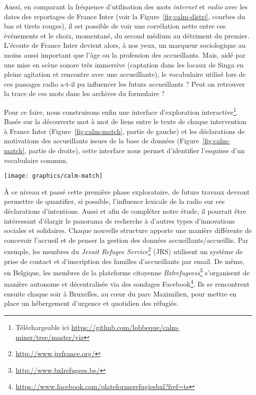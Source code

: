 \documentclass[symmetric,justified,marginals=raggedouter]{tufte-book}
\begin{document}
Aussi, en comparant la fréquence d'utilisation des mots \textit{internet} et \textit{radio} avec les dates des reportages de France Inter (voir la Figure~\ref{fig:calm-distri}, courbes du bas et tirets rouges), il est possible de voir une corrélation nette entre ces événements et le choix, momentané, du second médium au détriment du premier. L'écoute de France Inter devient alors, à nos yeux, un marqueur sociologique au moins aussi important que l'âge ou la profession des accueillants. Mais, aidé par une mise en scène sonore très immersive (captation dans les locaux de Singa en pleine agitation et rencontre avec une accueillante), le vocabulaire utilisé lors de ces passages radio a-t-il pu influencer les futurs accueillants ? Peut on retrouver la trace de ces mots dans les archives du formulaire ? 

Pour ce faire, nous construisons enfin une interface d'exploration interactive\footnote{\RaggedOuter Téléchargeable ici \url{https://github.com/lobbeque/calm-miner/tree/master/viz}}. Basée sur la découverte mot à mot de liens entre le texte de chaque intervention à France Inter (Figure~\ref{fig:calm-match}, partie de gauche) et les déclarations de motivations des accueillants issues de la base de données (Figure~\ref{fig:calm-match}, partie de droite), cette interface nous permet d'identifier l'esquisse d'un vocabulaire commun.

\begin{figure*}
  \texttt{[image: graphics/calm-match]}
  \caption{Utilisation d'un même vocabulaire (bleu) entre les reportages de France Inter (gauche) et les déclarations de motivation des accueillants (droite)}
  \label{fig:calm-match}
\end{figure*}

\noindent À ce niveau et passé cette première phase exploratoire, de futurs travaux devront permettre de quantifier, si possible, l'influence lexicale de la radio sur ces déclarations d'intentions. Aussi et afin de compléter notre étude, il pourrait être intéressant d'élargir le panorama de recherche à d'autres types d'innovations sociales et solidaires. Chaque nouvelle structure apporte une manière différente de concevoir l'accueil et de penser la gestion des données accueillants/accueillis. Par exemple, les membres du \textit{Jesuit Refugee Service}\footnote{\RaggedOuter \url{http://www.jrsfrance.org/}} (JRS) utilisent un système de prise de contact et d'inscription des familles d'accueillants par email. De même, en Belgique, les membres de la plateforme citoyenne \textit{Bxlrefugeess}\footnote{\RaggedOuter \url{http://www.bxlrefugees.be/}} s'organisent de manière autonome et décentralisée via des sondages Facebook\footnote{\RaggedOuter \url{https://www.facebook.com/plateformerefugiesbxl?fref=ts}}. Ils se rencontrent ensuite chaque soir à Bruxelles, au cœur du parc Maximilien, pour mettre en place un hébergement d'urgence et quotidien des réfugiés.
\end{document}
